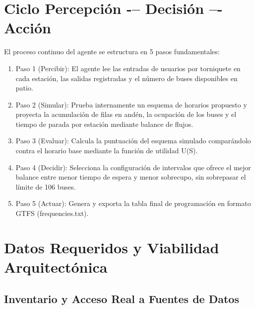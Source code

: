 \documentclass{article}
\begin{document}
\section{Ciclo Percepción -– Decisión –- Acción}

El proceso continuo del agente se estructura en 5 pasos fundamentales:

\begin{enumerate}
  \item Paso 1 (Percibir): El agente lee las entradas de usuarios por torniquete en cada estación, las salidas registradas y el número de buses disponibles en patio.
  \item Paso 2 (Simular): Prueba internamente un esquema de horarios propuesto y proyecta la acumulación de filas en andén, la ocupación de los buses y el tiempo de parada por estación mediante balance de flujos.
  \item Paso 3 (Evaluar): Calcula la puntuación del esquema simulado comparándolo contra el horario base mediante la función de utilidad U(S).
  \item Paso 4 (Decidir): Selecciona la configuración de intervalos que ofrece el mejor balance entre menor tiempo de espera y menor sobrecupo, sin sobrepasar el límite de 106 buses.
  \item Paso 5 (Actuar): Genera y exporta la tabla final de programación en formato GTFS (frequencies.txt).
\end{enumerate}


\section{Datos Requeridos y Viabilidad Arquitectónica}

\subsection{Inventario y Acceso Real a Fuentes de Datos}
\end{document}

